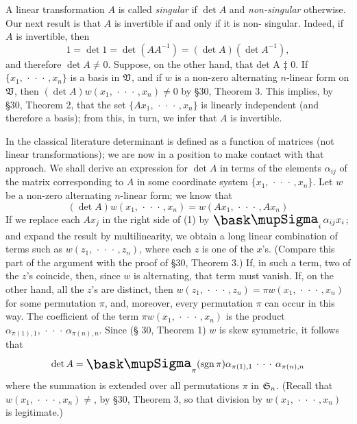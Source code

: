 A linear transformation \(A\) is called \emph{singular} if \(\det A\) and
\emph{non-singular} otherwise. Our next result is that \(A\) is invertible if
and only if it is non- singular. Indeed, if \(A\) is invertible, then
\begin{equation*}
    1 = \det 1 = \det (AA^{-1}) = (\det A)(\det A^{-1}),
\end{equation*}
and therefore \(\det A \neq 0\). Suppose, on the other hand, that det A ‡ 0. If
\(\{x_1, \,\cdot\,\cdot\,\cdot\,, x_n\}\) is a basis in \(\mathfrak{V}\), and if \(w\)
is a non-zero alternating \(n\)-linear form on \(\mathfrak{V}\), then \((\det A)w(x_1,
\,\cdot\,\cdot\,\cdot\,, x_n) \neq 0\)  by §30, Theorem 3. This implies, by §30,
Theorem 2, that the set \(\{Ax_1, \,\cdot\,\cdot\,\cdot\,, x_n\}\) is linearly
independent (and therefore a basis); from this, in turn, we infer that \(A\) is
invertible.

In the classical literature determinant is defined as a function of matrices
(not linear transformations); we are now in a position to make contact with that
approach. We shall derive an expression for \(\det A\) in terms of the elements
\(\alpha_{ij}\) of the matrix corresponding to \(A\) in some coordinate system
\(\{x_1, \,\cdot\,\cdot\,\cdot\,, x_n\}\). Let \(w\) be a non-zero alternating
\(n\)-linear form; we know that
\begin{equation}
    (\det A)w(x_1, \,\cdot\,\cdot\,\cdot\,, x_n) =
    w(Ax_1, \,\cdot\,\cdot\,\cdot\,, Ax_n)
\end{equation}
If we replace each \(Ax_j\) in the right side of (1) by \(\sumx_i \alpha_{ij}
x_i\); and expand the result by multilinearity, we obtain a long linear
combination of terms such as \(w(z_1, \,\cdot\,\cdot\,\cdot\,, z_n)\), where
each \(z\) is one of the \(x\)'s. (Compare this part of the argument with the
proof of §30, Theorem 3.) If, in such a term, two of the \(z\)'s coincide, then,
since \(w\) is alternating, that term must vanish. If, on the other hand, all
the \(z\)'s are distinct, then \(w(z_1, \,\cdot\,\cdot\,\cdot\,, z_n) = \pi
w(x_1, \,\cdot\,\cdot\,\cdot\,, x_n)\) for some permutation \(\pi\), and,
moreover, every permutation \(\pi\) can occur in this way. The coefficient of
the term \(\pi w(x_1, \,\cdot\,\cdot\,\cdot\,, x_n)\) is the product
\(\alpha_{\pi(1),1}, \,\cdot\,\cdot\,\cdot\, \alpha_{\pi(n),n} \). Since (§ 30,
Theorem 1) \(w\) is skew symmetric, it follows that
\begin{equation}
    \det A = \sumx_{\pi} (\sign \pi)\alpha_{\pi(1),1} \,\cdot\,\cdot\,\cdot\, \alpha_{\pi(n),n}
\end{equation}
where the summation is extended over all permutations \(\pi\) in \(\frak{S}_n\).
(Recall that \(w(x_1, \,\cdot\,\cdot\,\cdot\,, x_n) \neq \), by §30, Theorem 3,
so that division by \(w(x_1, \,\cdot\,\cdot\,\cdot\,, x_n)\) is legitimate.)

